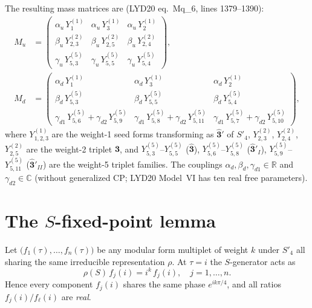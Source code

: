 \documentclass[a4paper,11pt]{article}
\newcommand{\Spf}{S'_4}
\newcommand{\tauCM}{\tau = i}
\newcommand{\Md}{M_d}
\newcommand{\Mu}{M_u}
\begin{document}
The resulting mass matrices are (LYD20 eq.~Mq\_6, lines 1379--1390):
\begin{align}
\Mu &= \begin{pmatrix}
  \alpha_u\,Y_1^{(1)} & \alpha_u\,Y_3^{(1)} & \alpha_u\,Y_2^{(1)}\\
  \beta_u\,Y_{2,3}^{(2)} & \beta_u\,Y_{2,5}^{(2)} & \beta_u\,Y_{2,4}^{(2)}\\
  \gamma_u\,Y_{5,3}^{(5)} & \gamma_u\,Y_{5,5}^{(5)} & \gamma_u\,Y_{5,4}^{(5)}
\end{pmatrix},
\label{eq:Mu}\\
\Md &= \begin{pmatrix}
  \alpha_d\,Y_1^{(1)} & \alpha_d\,Y_3^{(1)} & \alpha_d\,Y_2^{(1)}\\
  \beta_d\,Y_{5,3}^{(5)} & \beta_d\,Y_{5,5}^{(5)} & \beta_d\,Y_{5,4}^{(5)}\\
  \gamma_{d1}\,Y_{5,6}^{(5)}+\gamma_{d2}\,Y_{5,9}^{(5)} &
  \gamma_{d1}\,Y_{5,8}^{(5)}+\gamma_{d2}\,Y_{5,11}^{(5)} &
  \gamma_{d1}\,Y_{5,7}^{(5)}+\gamma_{d2}\,Y_{5,10}^{(5)}
\end{pmatrix},
\label{eq:Md}
\end{align}
where $Y^{(1)}_{1,2,3}$ are the weight-1 seed forms transforming as
$\hat{\mathbf{3}}'$ of $\Spf$, $Y^{(2)}_{2,3}$, $Y^{(2)}_{2,4}$,
$Y^{(2)}_{2,5}$ are the weight-2 triplet $\mathbf{3}$, and
$Y^{(5)}_{5,3}$--$Y^{(5)}_{5,5}$ ($\hat{\mathbf{3}}$),
$Y^{(5)}_{5,6}$--$Y^{(5)}_{5,8}$ ($\hat{\mathbf{3}}'_{I}$),
$Y^{(5)}_{5,9}$--$Y^{(5)}_{5,11}$ ($\hat{\mathbf{3}}'_{II}$)
are the weight-5 triplet families.
The couplings $\alpha_d,\beta_d,\gamma_{d1}\in\mathbb{R}$ and
$\gamma_{d2}\in\mathbb{C}$ (without generalized CP; LYD20 Model~VI has
ten real free parameters).

\section{The $S$-fixed-point lemma}
\label{sec:lemma}

\begin{lemma}[Collinearity at $\tauCM$]
\label{lem:collinear}
Let $\bigl(f_1(\tau),\ldots,f_n(\tau)\bigr)$ be any modular form
multiplet of weight $k$ under $\Spf$ all sharing the same irreducible
representation $\rho$.  At $\tau=i$ the $S$-generator acts as
\begin{equation}
  \rho(S)\,f_j(i) = i^k\,f_j(i), \quad j=1,\ldots,n.
\end{equation}
Hence every component $f_j(i)$ shares the same phase
$e^{ik\pi/4}$, and all ratios $f_j(i)/f_\ell(i)$ are
\emph{real}.
\end{lemma}
\end{document}
